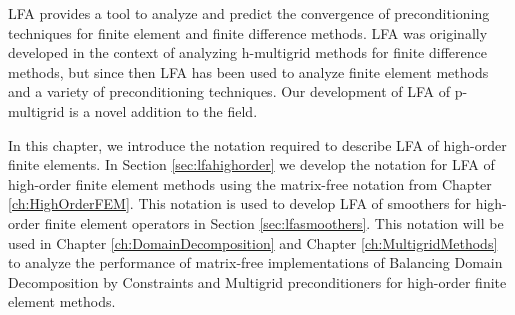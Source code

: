 LFA provides a tool to analyze and predict the convergence of preconditioning techniques for finite element and finite difference methods.
LFA \cite{brandt1977multi} was originally developed in the context of analyzing h-multigrid methods for finite difference methods, but since then LFA has been used to analyze finite element methods and a variety of preconditioning techniques.
Our development of LFA of p-multigrid is a novel addition to the field.

In this chapter, we introduce the notation required to describe LFA of high-order finite elements.
In Section \ref{sec:lfahighorder} we develop the notation for LFA of high-order finite element methods using the matrix-free notation from Chapter \ref{ch:HighOrderFEM}.
This notation is used to develop LFA of smoothers for high-order finite element operators in Section \ref{sec:lfasmoothers}.
This notation will be used in Chapter \ref{ch:DomainDecomposition} and Chapter \ref{ch:MultigridMethods} to analyze the performance of matrix-free implementations of Balancing Domain Decomposition by Constraints and Multigrid preconditioners for high-order finite element methods.
